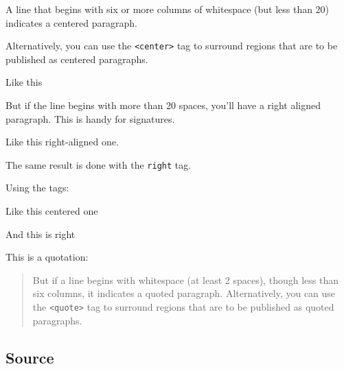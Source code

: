 \documentclass[DIV=12,%
               BCOR=0mm,%
               fontsize=10pt,%
               oneside,%
               paper=210mm:11in]{scrbook}
\begin{document}
A line that begins with six or more columns of whitespace
(but less than 20) indicates a centered paragraph.


Alternatively, you can use the \texttt{<center>} tag to surround regions that
are to be published as centered paragraphs.



\begin{center}

Like this


\end{center}


But if the line begins with more than 20 spaces, you'll have a right
aligned paragraph. This is handy for signatures.



\begin{flushright}

Like this right-aligned one.


\end{flushright}


The same result is done with the \texttt{right} tag.


Using the tags:



\begin{center}

Like this centered one


\end{center}



\begin{flushright}

And this is right


\end{flushright}


This is a quotation:



\begin{quote}


But if a line begins with whitespace (at least 2 spaces), though
less than six columns, it indicates a quoted paragraph.
Alternatively, you can use the \texttt{<quote>} tag to surround regions that
are to be published as quoted paragraphs.



\end{quote}

\subsection{Source}
\end{document}
